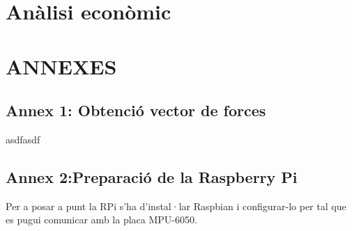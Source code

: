 \documentclass[twoside]{article}
\begin{document}


\newpage
\section{Anàlisi econòmic}

\newpage
\section*{ANNEXES}
\subsection*{Annex 1: Obtenció vector de forces}
asdfasdf 
\subsection*{Annex 2:Preparació de la Raspberry Pi}
Per a posar a punt la RPi s'ha d'instal·lar Raspbian i configurar-lo per tal que es pugui comunicar amb la placa MPU-6050.
\end{document}
